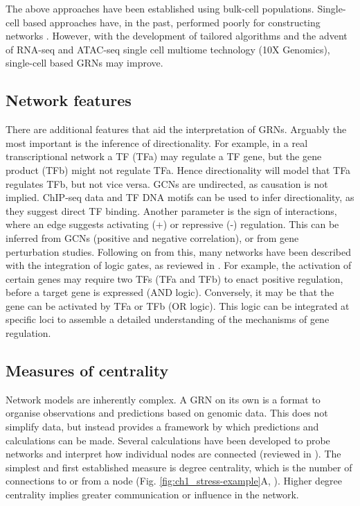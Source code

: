 The above approaches have been established using bulk-cell populations. Single-cell based approaches have, in the past, performed poorly for constructing networks \citep{chen_evaluating_2018}. However, with the development of tailored algorithms \citep{van_de_sande_scalable_2020, aibar_scenic_2017, gonzalez-blas_scenic_2022} and the advent of RNA-seq and ATAC-seq single cell multiome technology (10X Genomics), single-cell based GRNs may improve.

\subsection{Network features}

There are additional features that aid the interpretation of GRNs. Arguably the most important is the inference of directionality. For example, in a real transcriptional network a TF (TFa) may regulate a TF gene, but the gene product (TFb) might not regulate TFa. Hence directionality will model that TFa regulates TFb, but not vice versa. GCNs are undirected, as causation is not implied. ChIP-seq data and TF DNA motifs can be used to infer directionality, as they suggest direct TF binding. Another parameter is the sign of interactions, where an edge suggests activating (+) or repressive (-) regulation. This can be inferred from GCNs (positive and negative correlation), or from gene perturbation studies. Following on from this, many networks have been described with the integration of logic gates, as reviewed in \cite{materna_logic_2007}. For example, the activation of certain genes may require two TFs (TFa and TFb) to enact positive regulation, before a target gene is expressed (AND logic). Conversely, it may be that the gene can be activated by TFa or TFb (OR logic). This logic can be integrated at specific loci to assemble a detailed understanding of the mechanisms of gene regulation.

\subsection{\label{ch1:centrality}Measures of centrality}

Network models are inherently complex. A GRN on its own is a format to organise observations and predictions based on genomic data. This does not simplify data, but instead provides a framework by which predictions and calculations can be made. Several calculations have been developed to probe networks and interpret how individual nodes are connected (reviewed in \cite{landherr_critical_2010}). The simplest and first established measure is degree centrality, which is the number of connections to or from a node (Fig. \ref{fig:ch1_stress-example}A, \cite{nieminen_centrality_1974, bavelas_communication_1950}). Higher degree centrality implies greater communication or influence in the network.

